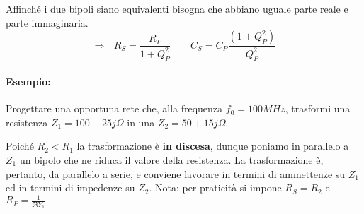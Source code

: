 Affinché i due bipoli siano equivalenti bisogna che abbiano uguale parte reale e parte immaginaria.
\begin{equation}
\Rightarrow ~~~ R_S = \frac{R_P}{1+Q_P^2}
\qquad
C_S = C_P \frac{(1+Q_P^2)}{Q_P^2}
\end{equation}

\paragraph{Esempio:} Progettare una opportuna rete che, alla frequenza $f_0 = 100MHz$, trasformi una resistenza $Z_1 = 100 + 25j \Omega$ in una $Z_2 = 50 +15j \Omega$.

Poiché $R_2 < R_1$ la trasformazione è \textbf{in discesa}, dunque poniamo in parallelo a $Z_1$ un bipolo che ne riduca il valore della resistenza.
La trasformazione è, pertanto, da parallelo a serie, e conviene lavorare in termini di ammettenze su $Z_1$ ed in termini di impedenze su $Z_2$.
Nota: per praticità si impone $R_S = R_2$ e $R_P = \frac{1}{\Re{Y_1}}$

